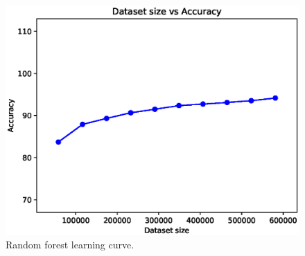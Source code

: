 \documentclass[a4paper, 10pt]{article}
\begin{document}
\begin{figure}[H]
 \centering
 \includegraphics[width=0.8\linewidth]{pictures/random_forest_size_vs_accuracy.eps}
 \caption{Random forest learning curve.}
 \label{fig:rf_learning}
\end{figure}
\end{document}
